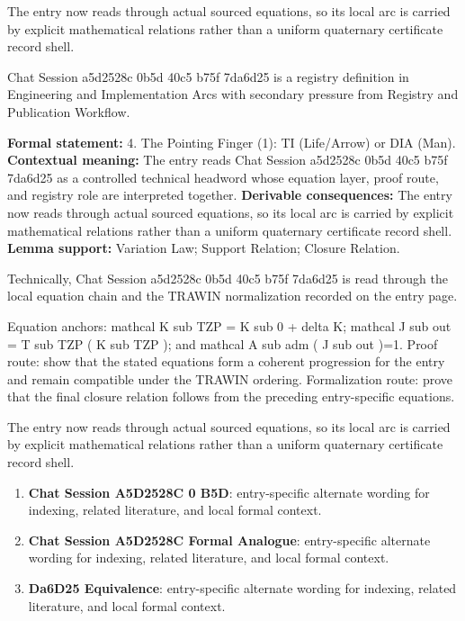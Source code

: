 The entry now reads through actual sourced equations, so its local arc is carried by explicit mathematical relations rather than a uniform quaternary certificate record shell.
\clearpage


\begingroup\small
{}
Chat Session a5d2528c 0b5d 40c5 b75f 7da6d25 is a registry definition in Engineering and Implementation Arcs with secondary pressure from Registry and Publication Workflow.

\begingroup\footnotesize\setlength{\emergencystretch}{3em}\sloppy
\textbf{Formal statement:} 4. The Pointing Finger (1): TI (Life/Arrow) or DIA (Man). \textbf{Contextual meaning:} The entry reads Chat Session a5d2528c 0b5d 40c5 b75f 7da6d25 as a controlled technical headword whose equation layer, proof route, and registry role are interpreted together. \textbf{Derivable consequences:} The entry now reads through actual sourced equations, so its local arc is carried by explicit mathematical relations rather than a uniform quaternary certificate record shell. \textbf{Lemma support:} Variation Law; Support Relation; Closure Relation.\par
\endgroup

Technically, Chat Session a5d2528c 0b5d 40c5 b75f 7da6d25 is read through the local equation chain and the TRAWIN normalization recorded on the entry page.

Equation anchors: mathcal K sub TZP = K sub 0 + delta K; mathcal J sub out = T sub TZP ( K sub TZP ); and mathcal A sub adm ( J sub out )=1. Proof route: show that the stated equations form a coherent progression for the entry and remain compatible under the TRAWIN ordering. Formalization route: prove that the final closure relation follows from the preceding entry-specific equations.

The entry now reads through actual sourced equations, so its local arc is carried by explicit mathematical relations rather than a uniform quaternary certificate record shell.
\endgroup

\begin{enumerate}[leftmargin=1.6em,itemsep=6pt,topsep=4pt]
\item \textbf{Chat Session A5D2528C 0 B5D}: entry-specific alternate wording for indexing, related literature, and local formal context.
\item \textbf{Chat Session A5D2528C Formal Analogue}: entry-specific alternate wording for indexing, related literature, and local formal context.
\item \textbf{Da6D25 Equivalence}: entry-specific alternate wording for indexing, related literature, and local formal context.
\end{enumerate}

